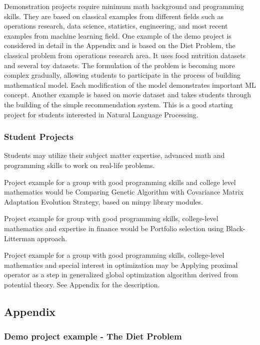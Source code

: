 Demonstration projects require minimum math background and programming skills. They are based on classical examples from different fields such as operations research, data science, statistics, engineering, and most recent examples from machine learning field. 
One example of the demo project is considered in detail in the Appendix and is based on the Diet Problem, the classical problem from operations research area. It uses food nutrition datasets  and several toy datasets. The formulation of the problem is becoming more complex gradually, allowing students to participate in the process of building mathematical model. Each modification of the model demonstrates important  ML concept.
Another example is based on movie dataset and takes students through the building of the simple recommendation system. This is a good starting project  for students interested in Natural Language Processing. 

\subsubsection{Student Projects \label{student projects}}

Students may utilize their subject matter expertise, advanced math and programming skills to work on real-life problems. 

Project example for a group with good programming skills and  college level mathematics would be Comparing Genetic Algorithm with Covariance Matrix Adaptation Evolution Strategy, based on minpy library modules.

Project example for group with good programming skills, college-level mathematics and expertise in finance would be Portfolio selection using Black-Litterman approach. 

Project example for a group with good programming skills, college-level mathematics  and special interest in optimization may be Applying proximal operator as a step in generalized global optimization algorithm derived from potential theory. See Appendix for the description.

\subsection{Appendix \label{appendix}}

\subsubsection{ Demo project  example - The Diet Problem \label{demo project example}}

